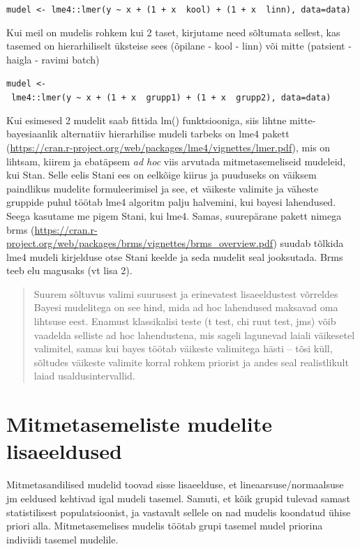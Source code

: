 \documentclass[]{book}
\begin{document}
\texttt{mudel\ \textless{}-\ lme4::lmer(y\ \textasciitilde{}\ x\ +\ (1\ +\ x\ \textbar{}\ kool)\ +\ (1\ +\ x\ \textbar{}\ linn),\ data=data)}

Kui meil on mudelis rohkem kui 2 taset, kirjutame need sõltumata sellest, kas tasemed on hierarhiliselt üksteise sees (õpilane - kool - linn) või mitte (patsient - haigla - ravimi batch)

\texttt{mudel\ \textless{}-\ lme4::lmer(y\ \textasciitilde{}\ x\ +\ (1\ +\ x\ \textbar{}\ grupp1)\ +\ (1\ +\ x\ \textbar{}\ grupp2),\ data=data)}

Kui esimesed 2 mudelit saab fittida lm() funktsiooniga, siis lihtne mitte-bayesiaanlik alternatiiv hierarhilise mudeli tarbeks on lme4 pakett (\url{https://cran.r-project.org/web/packages/lme4/vignettes/lmer.pdf}), mis on lihtsam, kiirem ja ebatäpsem \emph{ad hoc} viis arvutada mitmetasemeliseid mudeleid, kui Stan. Selle eelis Stani ees on eelkõige kiirus ja puuduseks on väiksem paindlikus mudelite formuleerimisel ja see, et väikeste valimite ja väheste gruppide puhul töötab lme4 algoritm palju halvemini, kui bayesi lahendused. Seega kasutame me pigem Stani, kui lme4. Samas, suurepärane pakett nimega brms (\url{https://cran.r-project.org/web/packages/brms/vignettes/brms_overview.pdf}) suudab tõlkida lme4 mudeli kirjelduse otse Stani keelde ja seda mudelit seal jooksutada. Brms teeb elu magusaks (vt lisa 2).

\begin{quote}
Suurem sõltuvus valimi suurusest ja erinevatest lisaeeldustest võrreldes Bayesi mudelitega on see hind, mida ad hoc lahendused maksavad oma lihtsuse eest. Enamust klassikalisi teste (t test, chi ruut test, jms) võib vaadelda selliste ad hoc lahendustena, mis sageli lagunevad laiali väikesetel valimitel, samas kui bayes töötab väikeste valimitega hästi -- tõsi küll, sõltudes väikeste valimite korral rohkem priorist ja andes seal realistlikult laiad usaldusintervallid.
\end{quote}

\hypertarget{mitmetasemeliste-mudelite-lisaeeldused}{%
\section{Mitmetasemeliste mudelite lisaeeldused}\label{mitmetasemeliste-mudelite-lisaeeldused}}

Mitmetasandilised mudelid toovad sisse lisaeelduse, et lineaarsuse/normaalsuse jm eeldused kehtivad igal mudeli tasemel. Samuti, et kõik grupid tulevad samast statistilisest populatsioonist, ja vastavalt sellele on nad mudelis koondatud ühise priori alla. Mitmetasemelises mudelis töötab grupi tasemel mudel priorina indiviidi tasemel mudelile.
\end{document}
